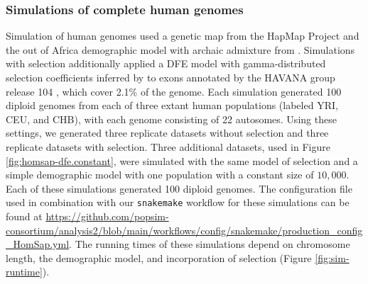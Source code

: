 \documentclass[hidelinks]{article}
\newcommand{\stdpopsim}{\texttt{stdpopsim}\xspace}
\newcommand{\snakemake}{\texttt{snakemake}\xspace}
\begin{document}
    \subsubsection*{Simulations of complete human genomes}
    Simulation of human genomes used a genetic map from the HapMap Project
    \citep[\stdpopsim label \texttt{HapMapII\_GRCh38}]{international2007second} and
    the out of Africa demographic model with archaic admixture from
    \citet[\stdpopsim label \texttt{OutOfAfricaArchaicAdmixture\_5R19}]{ragsdale2019models}.
    Simulations with selection additionally applied a DFE model with gamma-distributed selection coefficients inferred by
    \citet[\stdpopsim label \texttt{Gamma\_K17}]{kim2017inference} to exons annotated by the HAVANA group release 104
    \citep[\stdpopsim label \texttt{ensembl\_havana\_104\_exons}]{ensembl2018},
    which cover 2.1\% of the genome. 
    Each simulation generated 100 diploid genomes from each of three extant human populations (labeled YRI, CEU, and CHB),
    with each genome consisting of 22 autosomes.
    Using these settings, we generated three replicate datasets without selection
    and three replicate datasets with selection.
    Three additional datasets, used in Figure \ref{fig:homsap-dfe.constant},
    were simulated with the same model of selection and a simple demographic model with one population with a constant size of $10,000$.
    Each of these simulations generated 100 diploid genomes.
    The configuration file used in combination with our \snakemake workflow
    for these simulations can be found at \url{https://github.com/popsim-consortium/analysis2/blob/main/workflows/config/snakemake/production_config_HomSap.yml}.
    The running times of these simulations depend on chromosome length, the demographic model, and incorporation of selection (Figure \ref{fig:sim-runtime}).
\end{document}
